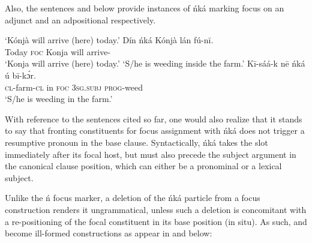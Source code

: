 \documentclass[output=paper,colorlinks,citecolor=brown]{langscibook}
\begin{document}
Also, the sentences  and  below provide instances of ńká marking focus on an adjunct and an adpositional respectively.

\ea%
    \label{ex:bisilki:14}
    \jambox*{[canonical]}
    \glt    ‘Kónjà will arrive (here) today.’
    \ex\label{ex:bisilki:14b}
    \gll    Dín		ńká	Kónjà		lán	fú-nī.\\
            Today		\textsc{foc}	Konja		will	arrive-\\
    \glt    ‘Konja will arrive (here) today.’
    \glt    ‘S/he is weeding inside the farm.’
    \ex\label{ex:bisilki:14d}
    \gll    Kī-sáá-k	nē	ńká	ú		bī-kɔ́r.\\
            \textsc{cl-}farm\textsc{-cl}	in	\textsc{foc}	\textsc{3sg.subj}	\textsc{prog-}weed\\
    \glt    ‘S/he is weeding in the farm.’
    \z
\z

With reference to the sentences cited so far, one would also realize that it stands to say that fronting constituents for focus assignment with ńká does not trigger a resumptive pronoun in the base clause. Syntactically, ńká takes the slot immediately after its focal host, but must also precede the subject argument in the canonical clause position, which can either be a pronominal or a lexical subject.

Unlike the ń focus marker, a deletion of the ńká particle from a focus construction renders it ungrammatical, unless such a deletion is concomitant with a re-positioning of the focal constituent in its base position (in situ). As such,  and  become ill-formed constructions as appear in  and  below:

\ea%
    \label{ex:bisilki:15}
    \z 
\z 
\end{document}
